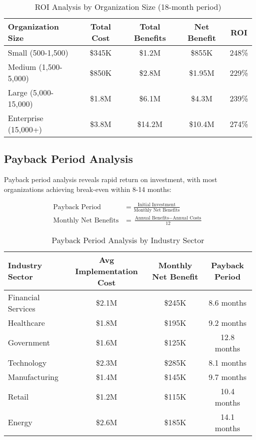 \documentclass[11pt,a4paper]{article}
\begin{document}
\begin{table}[H]
\centering
\caption{ROI Analysis by Organization Size (18-month period)}
\label{tab:roi_analysis}
\begin{tabular}{lcccc}
\toprule
Organization Size & Total Cost & Total Benefits & Net Benefit & ROI \\
\midrule
Small (500-1,500) & \$345K & \$1.2M & \$855K & 248\% \\
Medium (1,500-5,000) & \$850K & \$2.8M & \$1.95M & 229\% \\
Large (5,000-15,000) & \$1.8M & \$6.1M & \$4.3M & 239\% \\
Enterprise (15,000+) & \$3.8M & \$14.2M & \$10.4M & 274\% \\
\bottomrule
\end{tabular}
\end{table}

\subsection{Payback Period Analysis}

Payback period analysis reveals rapid return on investment, with most organizations achieving break-even within 8-14 months:

\begin{align}
\text{Payback Period} &= \frac{\text{Initial Investment}}{\text{Monthly Net Benefits}} \\
\text{Monthly Net Benefits} &= \frac{\text{Annual Benefits} - \text{Annual Costs}}{12}
\end{align}

\begin{table}[H]
\centering
\caption{Payback Period Analysis by Industry Sector}
\label{tab:payback_analysis}
\begin{tabular}{lccc}
\toprule
Industry Sector & Avg Implementation Cost & Monthly Net Benefit & Payback Period \\
\midrule
Financial Services & \$2.1M & \$245K & 8.6 months \\
Healthcare & \$1.8M & \$195K & 9.2 months \\
Government & \$1.6M & \$125K & 12.8 months \\
Technology & \$2.3M & \$285K & 8.1 months \\
Manufacturing & \$1.4M & \$145K & 9.7 months \\
Retail & \$1.2M & \$115K & 10.4 months \\
Energy & \$2.6M & \$185K & 14.1 months \\
\bottomrule
\end{tabular}
\end{table}
\end{document}
